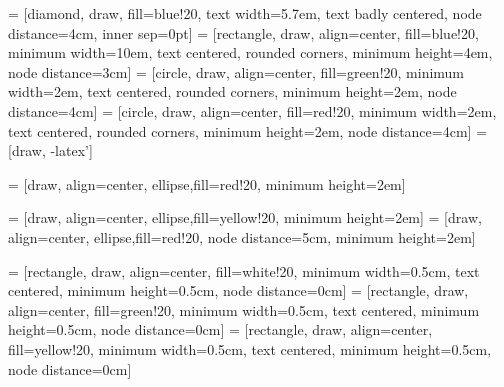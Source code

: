  = [diamond, draw, fill=blue!20, 
    text width=5.7em, text badly centered, node distance=4cm, inner sep=0pt]
 = [rectangle, draw, align=center, fill=blue!20, minimum width=10em,
	text centered, rounded corners, minimum height=4em, node distance=3cm]
 = [circle, draw, align=center, fill=green!20, minimum width=2em,
	text centered, rounded corners, minimum height=2em, node distance=4cm]
 = [circle, draw, align=center, fill=red!20, minimum width=2em,
	text centered, rounded corners, minimum height=2em, node distance=4cm]
 = [draw, -latex']

 = [draw, align=center, ellipse,fill=red!20,
    minimum height=2em]
    
 = [draw, align=center, ellipse,fill=yellow!20,
    minimum height=2em]
 = [draw, align=center, ellipse,fill=red!20, node distance=5cm,
    minimum height=2em]

 = [rectangle, draw, align=center, fill=white!20, minimum width=0.5cm,
	text centered, minimum height=0.5cm, node distance=0cm]
 = [rectangle, draw, align=center, fill=green!20, minimum width=0.5cm,
	text centered, minimum height=0.5cm, node distance=0cm]
 = [rectangle, draw, align=center, fill=yellow!20, minimum width=0.5cm,
	text centered, minimum height=0.5cm, node distance=0cm]